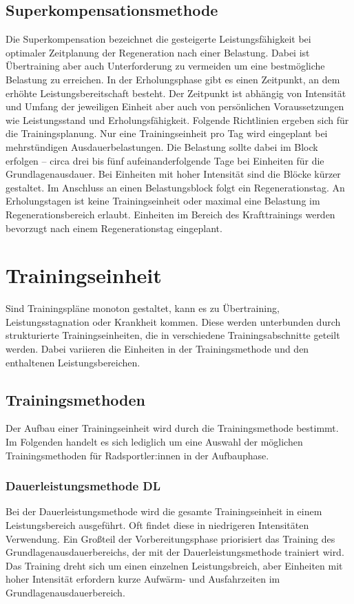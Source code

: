 \subsection{Superkompensationsmethode}
Die Superkompensation bezeichnet die gesteigerte Leistungsfähigkeit bei optimaler Zeitplanung der Regeneration nach einer Belastung.\cite[163]{Trainingswissenschaft} Dabei ist Übertraining aber auch Unterforderung zu vermeiden um eine bestmögliche Belastung zu erreichen. In der Erholungsphase gibt es einen Zeitpunkt, an dem erhöhte Leistungsbereitschaft besteht. Der Zeitpunkt ist abhängig von Intensität und Umfang der jeweiligen Einheit aber auch von persönlichen Voraussetzungen wie Leistungsstand und Erholungsfähigkeit. \newline
Folgende Richtlinien ergeben sich für die Trainingsplanung. \cite[44-46]{Radsporttraining} Nur eine Trainingseinheit pro Tag wird eingeplant bei mehrstündigen Ausdauerbelastungen. Die Belastung sollte dabei im Block erfolgen -- circa drei bis fünf aufeinanderfolgende Tage bei Einheiten für die Grundlagenausdauer. Bei Einheiten mit hoher Intensität sind die Blöcke kürzer gestaltet. Im Anschluss an einen Belastungsblock folgt ein Regenerationstag. An Erholungstagen ist keine Trainingseinheit oder maximal eine Belastung im Regenerationsbereich erlaubt. Einheiten im Bereich des Krafttrainings werden bevorzugt nach einem Regenerationstag eingeplant. 

\section{Trainingseinheit}
\label{grundlagen:einheiten}
Sind Trainingspläne monoton gestaltet, kann es zu Übertraining, Leistungsstagnation oder Krankheit kommen. Diese werden unterbunden durch strukturierte Trainingseinheiten, die in verschiedene Trainingsabschnitte geteilt werden. Dabei variieren die Einheiten in der Trainingsmethode und den enthaltenen Leistungsbereichen.
\subsection{Trainingsmethoden}
\label{grundlagen:methoden}
Der Aufbau einer Trainingseinheit wird durch die Trainingsmethode bestimmt. Im Folgenden handelt es sich lediglich um eine Auswahl der möglichen Trainingsmethoden für Radsportler:innen in der Aufbauphase.  \cite[40-43]{Radsporttraining} 
\subsubsection{Dauerleistungsmethode DL}
Bei der Dauerleistungsmethode wird die gesamte Trainingseinheit in einem Leistungsbereich ausgeführt. Oft findet diese in niedrigeren Intensitäten Verwendung. Ein Großteil der Vorbereitungsphase priorisiert das Training des Grundlagenausdauerbereichs, der mit der Dauerleistungsmethode trainiert wird.
Das Training dreht sich um einen einzelnen Leistungsbreich, aber Einheiten mit hoher Intensität erfordern kurze Aufwärm- und Ausfahrzeiten im Grundlagenausdauerbereich.
